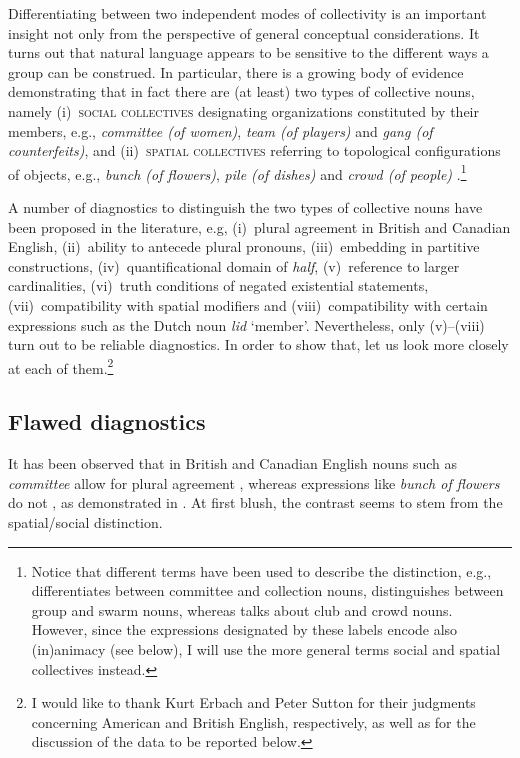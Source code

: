 \documentclass[output=paper]{langscibook}
\begin{document}
Differentiating between two independent modes of collectivity is an important insight not only from the perspective of general conceptual considerations. It turns out that natural language appears to be sensitive to the different ways a group can be construed. In particular, there is a growing body of evidence demonstrating that in fact there are (at least) two types of collective nouns, namely (i)~\textsc{social collectives} designating organizations constituted by their members, e.g., \textit{committee (of women)}, \textit{team (of players)} and \textit{gang (of counterfeits)}, and (ii)~\textsc{spatial collectives} referring to topological configurations of objects, e.g., \textit{bunch (of flowers)}, \textit{pile (of dishes)} and \textit{crowd (of people)} \citep{pearson2011new,de_vries2015shifting,henderson2017swarms,zwarts2020contiguity}.\footnote{Notice that different terms have been used to describe the distinction, e.g., \citeauthor{pearson2011new} differentiates between committee and collection nouns, \citeauthor{henderson2017swarms} distinguishes between group and swarm nouns, whereas \citeauthor{zwarts2020contiguity} talks about club and crowd nouns. However, since the expressions designated by these labels encode also (in)animacy (see below), I will use the more general terms social and spatial collectives instead.}

A number of diagnostics to distinguish the two types of collective nouns have been proposed in the literature, e.g, (i)~plural agreement in British and Canadian English, (ii)~ability to antecede plural pronouns, (iii)~embedding in partitive constructions, (iv)~quantificational domain of \textit{half}, (v)~reference to larger cardinalities, (vi)~truth conditions of negated existential statements, (vii)~compatibility with spatial modifiers and (viii)~compatibility with certain expressions such as the Dutch noun \textit{lid} `member'. Nevertheless, only (v)--(viii) turn out to be reliable diagnostics. In order to show that, let us look more closely at each of them.\footnote{I would like to thank Kurt Erbach and Peter Sutton for their judgments concerning American and British English, respectively, as well as for the discussion of the data to be reported below.}

\subsection{Flawed diagnostics}\label{wan:sec:flawed-diagnostics}

It has been observed that in British and Canadian English nouns such as \textit{committee} allow for plural agreement \citep{barker1992group}, whereas expressions like \textit{bunch of flowers} do not \citep{pearson2011new}, as demonstrated in . At first blush, the contrast seems to stem from the spatial/social distinction.
\end{document}
